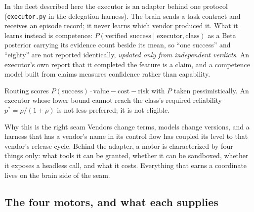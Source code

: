 In the fleet described here the executor is an adapter behind one protocol (\texttt{executor.py} in the delegation harness). The brain sends a task contract and receives an episode record; it never learns which vendor produced it. What it learns instead is competence: $P(\text{verified success} \mid \text{executor}, \text{class})$ as a Beta posterior carrying its evidence count beside its mean, so ``one success'' and ``eighty'' are not reported identically, \emph{updated only from independent verdicts}. An executor's own report that it completed the feature is a claim, and a competence model built from claims measures confidence rather than capability.

Routing scores $P(\text{success})\cdot\text{value} - \text{cost} - \text{risk}$ with $P$ taken pessimistically. An executor whose lower bound cannot reach the class's required reliability $p^{*} = \rho/(1+\rho)$ is not less preferred; it is not eligible.

\begin{claimbox}{Why this is the right seam}
Vendors change terms, models change versions, and a harness that has a vendor's name in its control flow has coupled its level to that vendor's release cycle. Behind the adapter, a motor is characterized by four things only: what tools it can be granted, whether it can be sandboxed, whether it exposes a headless call, and what it costs. Everything that earns a coordinate lives on the brain side of the seam.
\end{claimbox}

\subsection{The four motors, and what each supplies}

